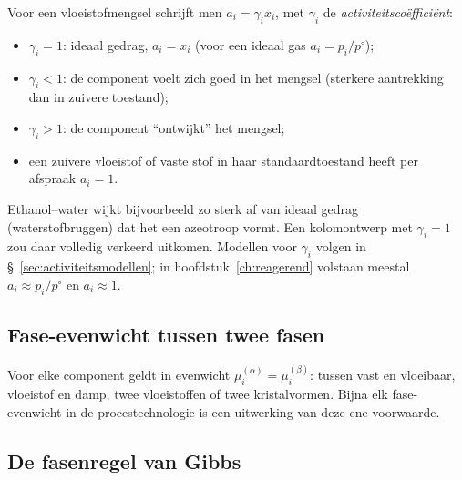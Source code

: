 Voor een vloeistofmengsel schrijft men $a_i = \gamma_i x_i$, met $\gamma_i$ de \emph{activiteitsco\"effici\"ent}:
\begin{itemize}
\item $\gamma_i = 1$: ideaal gedrag, $a_i = x_i$ (voor een ideaal gas $a_i = p_i/p^\circ$);
\item $\gamma_i < 1$: de component voelt zich goed in het mengsel (sterkere aantrekking dan in zuivere toestand);
\item $\gamma_i > 1$: de component ``ontwijkt'' het mengsel;
\item een zuivere vloeistof of vaste stof in haar standaardtoestand heeft per afspraak $a_i = 1$.
\end{itemize}
Ethanol--water wijkt bijvoorbeeld zo sterk af van ideaal gedrag (waterstofbruggen) dat het een azeotroop vormt. Een kolomontwerp met $\gamma_i = 1$ zou daar volledig verkeerd uitkomen. Modellen voor $\gamma_i$ volgen in \S~\ref{sec:activiteitsmodellen}; in hoofdstuk~\ref{ch:reagerend} volstaan meestal $a_i \approx p_i/p^\circ$ en $a_i \approx 1$.

\subsection{Fase-evenwicht tussen twee fasen}
\label{sec:fase-evenwicht-voorwaarde}

Voor elke component geldt in evenwicht $\mu_i^{(\alpha)} = \mu_i^{(\beta)}$: tussen vast en vloeibaar, vloeistof en damp, twee vloeistoffen of twee kristalvormen. Bijna elk fase-evenwicht in de procestechnologie is een uitwerking van deze ene voorwaarde.


\subsection{De fasenregel van Gibbs}
\label{sec:fasenregel}

